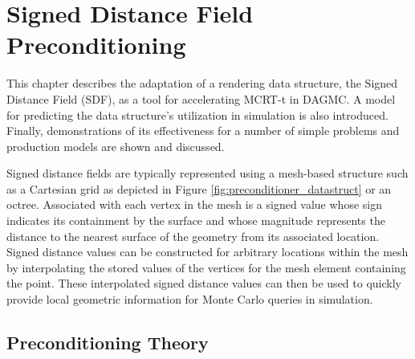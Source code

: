 

\newcommand{\precondQuery}[4] {
  \null %
  \subsection{#1}\label{subsec:#1}
  \begin{adjustwidth}{1em}{0pt}
    \begin{figure}[h]
      \begin{center}
        {width=0.75\textwidth}
        \caption[Depiction of SDF preconditioning for the \textit{#1} geometry query.]{#3}
        \label{fig:#2}
      \end{center}
    \end{figure}
    #4
  \end{adjustwidth}
}

\newcommand{\sdfModel}[2] {
  \null %
  \textbf{\uppercase{#1}} 
  \begin{adjustwidth}{2.5em}{0pt}
    #2
  \end{adjustwidth}
  \null
}

\chapter{Signed Distance Field Preconditioning}\label{ch:preconditioning}

This chapter describes the adaptation of a rendering data structure, the Signed
Distance Field (SDF), as a tool for accelerating MCRT-t in DAGMC. A model for
predicting the data structure's utilization in simulation is also
introduced. Finally, demonstrations of its effectiveness for a number of simple
problems and production models are shown and discussed.

Signed distance fields are typically represented using a mesh-based structure
such as a Cartesian grid as depicted in Figure
\ref{fig:preconditioner_datastruct} or an octree. Associated with each vertex in
the mesh is a signed value whose sign indicates its containment by the surface
and whose magnitude represents the distance to the nearest surface of the
geometry from its associated location. Signed distance values can be constructed
for arbitrary locations within the mesh by interpolating the stored values of
the vertices for the mesh element containing the point. These interpolated
signed distance values can then be used to quickly provide local geometric
information for Monte Carlo queries in simulation.

\section{Preconditioning Theory}\label{sec:preconditioner_theory}

